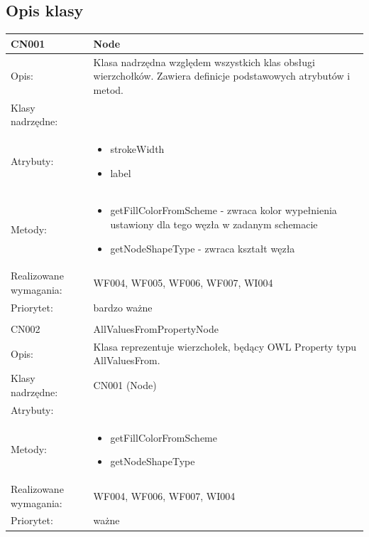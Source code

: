 \documentclass[a4paper,10pt]{article}
\begin{document}
\subsection{Opis klasy}

\begin{center}
 


\begin{longtable}{|m{3cm}|m{9cm}|} \hline

CN001 & Node \\ \hline
Opis: & Klasa nadrzędna względem wszystkich klas obsługi wierzchołków. Zawiera definicje podstawowych atrybutów i metod.    \\ \hline
Klasy nadrzędne: &     \\ \hline
Atrybuty: & \begin{itemize}
 \item strokeWidth
 \item label
\end{itemize}
 \\ \hline
Metody: & \begin{itemize}
 \item getFillColorFromScheme - zwraca kolor wypełnienia ustawiony dla tego węzła w zadanym schemacie
 \item getNodeShapeType - zwraca kształt węzła
\end{itemize}
  \\ \hline
Realizowane wymagania: & WF004, WF005, WF006, WF007, WI004 \\ \hline
Priorytet: & bardzo ważne  \\ \hline

\multicolumn{2}{c}{} \\
 \hline

CN002 & AllValuesFromPropertyNode \\ \hline
Opis: & Klasa reprezentuje wierzchołek, będący OWL Property typu AllValuesFrom.    \\ \hline
Klasy nadrzędne: & CN001 (Node)     \\ \hline
Atrybuty: & 
 \\ \hline
Metody: & \begin{itemize}
 \item getFillColorFromScheme
 \item getNodeShapeType
\end{itemize}
  \\ \hline
Realizowane wymagania: & WF004, WF006, WF007, WI004 \\ \hline
Priorytet: & ważne \\ \hline


\end{longtable}
\end{center}
\end{document}
